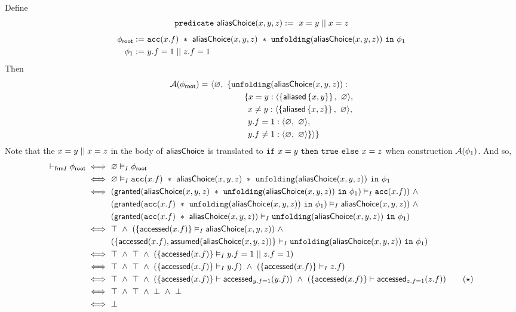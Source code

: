 Define
%
\begin{align*}
\texttt{predicate} \ \textsf{aliasChoice}(x, y, z) := \
x = y \mid\mid x = z
\end{align*}
%
\begin{align*}
{\phi_\textsf{root}} := & \
\texttt{acc}(x.f) \ \ast \ \textsf{aliasChoice}(x,y,z) \ \ast \
\texttt{unfolding}(\textsf{aliasChoice}(x,y,z)) \ \texttt{in} \ \phi_1
\\
\phi_1 := & \
y.f = 1 \mid\mid z.f = 1
\end{align*}
%
Then
\begin{align*}
\mathcal{A}({\phi_\textsf{root}}) =
& \hspace{0.0em} \ \langle \varnothing ,\ \{ \texttt{unfolding}(\textsf{aliasChoice}(x,y,z)) : \\
& \hspace{4.0em} \    \{ x = y : \langle \left\{  \textsf{aliased}\left\{ x,y \right\}  \right\} ,\ \varnothing \rangle , \\
& \hspace{4.1em} \    \  x \neq y   : \langle \left\{  \textsf{aliased}\left\{ x,z \right\}  \right\} ,\ \varnothing \rangle , \\
& \hspace{4.1em} \    \  y.f = 1    : \langle \varnothing ,\ \varnothing \rangle , \\
& \hspace{4.1em} \    \  y.f \neq 1 : \langle \varnothing ,\ \varnothing \rangle \} \rangle \}
\end{align*}
Note that the $x = y \mid\mid x = z$ in the body of $\textsf{aliasChoice}$ is translated to $\texttt{if} \ x = y \ \texttt{then} \ \texttt{true} \ \texttt{else} \ x = z$ when construction $\mathcal{A}(\phi_1)$.
And so,
\begin{align*}
\selfframing \phiroot
\iff & \
\empty \frames \phiroot
\\ \iff & \
\empty \frames
\cacc(x.f) \ \ast \ \aliasChoice(x,y,z) \ \ast \ \cunfolding(\aliasChoice(x,y,z)) \ \cin \ \phi_1
\\ \iff & \
( \granted(\aliasChoice(x,y,z) \ \ast \ \cunfolding(\aliasChoice(x,y,z)) \ \cin \ \phi_1) \frames \cacc(x.f) ) \ \land \\ & \
( \granted(\cacc(x.f) \ \ast \  \cunfolding(\aliasChoice(x,y,z)) \ \cin \ \phi_1) \frames \aliasChoice(x,y,z) ) \ \land \\ & \
( \granted(\cacc(x.f) \ \ast \ \aliasChoice(x,y,z)) \frames \cunfolding(\aliasChoice(x,y,z)) \ \cin \ \phi_1 )
\\ \iff & \
\top \ \land \
( \set{ \accessed(x.f) } \frames \aliasChoice(x,y,z) ) \ \land \\ & \
( \set{ \accessed(x.f), \assumed(\aliasChoice(x,y,z)) } \frames \cunfolding(\aliasChoice(x,y,z)) \ \cin \ \phi_1 )
\\ \iff & \
\top \ \land \ \top \ \land \ ( \set{ \accessed(x.f) } \frames y.f = 1 \bor z.f = 1 )
\\ \iff & \
\top \ \land \ \top \ \land \
( \set{ \accessed(x.f) } \frames y.f ) \ \land \
( \set{ \accessed(x.f) } \frames z.f )
\\ \iff & \
\top \ \land \ \top \ \land \
( \set{ \accessed(x.f) } \entails \accessed_{y.f = 1}(y.f) ) \ \land \
( \set{ \accessed(x.f) } \entails \accessed_{z.f = 1}(z.f) )
\tag{$\star$}
\\ \iff & \
\top \ \land \ \top \ \land \
\bot \ \land \
\bot
\\ \iff & \
\bot
\end{align*}
